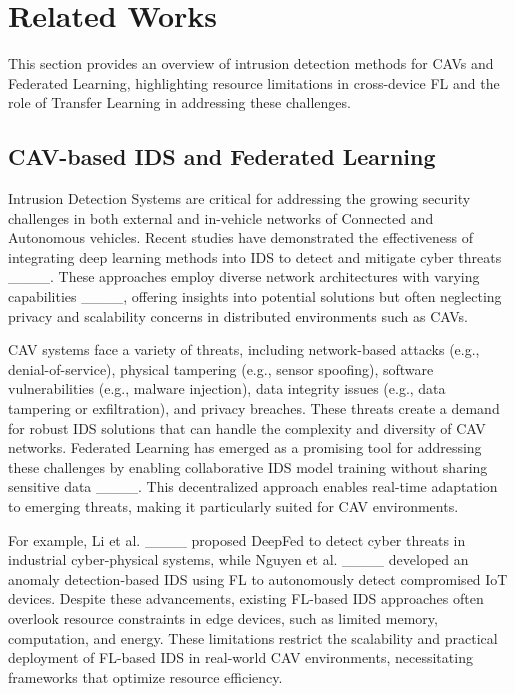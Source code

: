\section{Related Works}
This section provides an overview of intrusion detection methods for CAVs and Federated Learning, highlighting resource limitations in cross-device FL and the role of Transfer Learning in addressing these challenges.

\subsection{CAV-based IDS and Federated Learning}
Intrusion Detection Systems are critical for addressing the growing security challenges in both external and in-vehicle networks of Connected and Autonomous vehicles. Recent studies have demonstrated the effectiveness of integrating deep learning methods into IDS to detect and mitigate cyber threats ____. These approaches employ diverse network architectures with varying capabilities ____, offering insights into potential solutions but often neglecting privacy and scalability concerns in distributed environments such as CAVs.

CAV systems face a variety of threats, including network-based attacks (e.g., denial-of-service), physical tampering (e.g., sensor spoofing), software vulnerabilities (e.g., malware injection), data integrity issues (e.g., data tampering or exfiltration), and privacy breaches. These threats create a demand for robust IDS solutions that can handle the complexity and diversity of CAV networks. Federated Learning has emerged as a promising tool for addressing these challenges by enabling collaborative IDS model training without sharing sensitive data ____. This decentralized approach enables real-time adaptation to emerging threats, making it particularly suited for CAV environments.

For example, Li et al. ____ proposed DeepFed to detect cyber threats in industrial cyber-physical systems, while Nguyen et al. ____ developed an anomaly detection-based IDS using FL to autonomously detect compromised IoT devices. Despite these advancements, existing FL-based IDS approaches often overlook resource constraints in edge devices, such as limited memory, computation, and energy. These limitations restrict the scalability and practical deployment of FL-based IDS in real-world CAV environments, necessitating frameworks that optimize resource efficiency.


